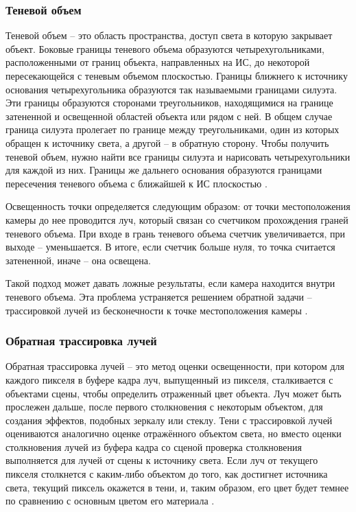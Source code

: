 \subsubsection*{Теневой объем}

Теневой объем -- это область пространства, доступ света в которую закрывает объект. Боковые границы теневого объема образуются четырехугольниками, расположенными от границ объекта, направленных на ИС, до некоторой пересекающейся с теневым объемом плоскостью. Границы ближнего к источнику основания четырехугольника образуются так называемыми границами силуэта. Эти границы образуются сторонами треугольников, находящимися на границе затененной и освещенной областей объекта или рядом с ней. В общем случае граница силуэта пролегает по границе между треугольниками, один из которых обращен к источнику света, а другой -- в обратную сторону. Чтобы получить теневой объем, нужно найти все границы силуэта и нарисовать четырехугольники для каждой из них. Границы же дальнего основания образуются границами пересечения теневого объема с ближайшей к ИС плоскостью \cite{shad_vol}.

Освещенность точки определяется следующим образом: от точки местоположения камеры до нее проводится луч, который связан со счетчиком прохождения граней теневого объема. При входе в грань теневого объема счетчик увеличивается, при выходе -- уменьшается. В итоге, если счетчик больше нуля, то точка считается затененной, иначе -- она освещена.

Такой подход может давать ложные результаты, если камера находится внутри теневого объема. Эта проблема устраняется решением обратной задачи -- трассировкой лучей из бесконечности к точке местоположения камеры \cite{shad_vol}.

\subsubsection*{Обратная трассировка лучей}

Обратная трассировка лучей -- это метод оценки освещенности, при котором для каждого пикселя в буфере кадра луч, выпущенный из пикселя, сталкивается с объектами сцены, чтобы определить отраженный цвет объекта. Луч может быть прослежен дальше, после первого столкновения с некоторым объектом, для создания эффектов, подобных зеркалу или стеклу. Тени с трассировкой лучей оцениваются аналогично оценке отражённого объектом света, но вместо оценки столкновения лучей из буфера кадра со сценой проверка столкновения выполняется для лучей от сцены к источнику света. Если луч от текущего пикселя столкнется с каким-либо объектом до того, как достигнет источника света, текущий пиксель окажется в тени, и, таким образом, его цвет будет темнее по сравнению с основным цветом его материала \cite{engel2008programming}.

